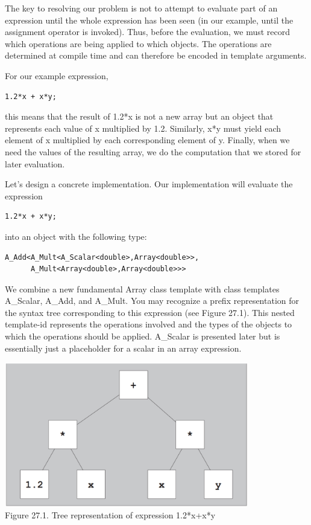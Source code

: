 
The key to resolving our problem is not to attempt to evaluate part of an expression until the whole expression has been seen (in our example, until the assignment operator is invoked). Thus, before the evaluation, we must record which operations are being applied to which objects. The operations are determined at compile time and can therefore be encoded in template arguments.

For our example expression,

\begin{lstlisting}[style=styleCXX]
1.2*x + x*y;
\end{lstlisting}

this means that the result of 1.2*x is not a new array but an object that represents each value of x multiplied by 1.2. Similarly, x*y must yield each element of x multiplied by each corresponding element of y. Finally, when we need the values of the resulting array, we do the computation that we stored for later evaluation.

Let’s design a concrete implementation. Our implementation will evaluate the expression

\begin{lstlisting}[style=styleCXX]
1.2*x + x*y;
\end{lstlisting}

into an object with the following type:

\begin{lstlisting}[style=styleCXX]
A_Add<A_Mult<A_Scalar<double>,Array<double>>,
	  A_Mult<Array<double>,Array<double>>>
\end{lstlisting}

We combine a new fundamental Array class template with class templates A\_Scalar, A\_Add, and A\_Mult. You may recognize a prefix representation for the syntax tree corresponding to this expression (see Figure 27.1). This nested template-id represents the operations involved and the types of the objects to which the operations should be applied. A\_Scalar is presented later but is essentially just a placeholder for a scalar in an array expression.

\begin{center}
\includegraphics[width=0.8\textwidth]{content/3/chapter27/images/1.png} \\
Figure 27.1. Tree representation of expression 1.2*x+x*y
\end{center}

